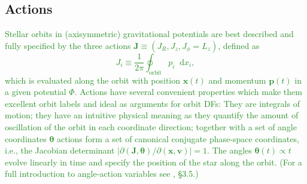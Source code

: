 \documentclass[iop,revtex4]{emulateapj}
\newcommand{\vect}[1]{\boldsymbol{#1}}
\newcommand*\diff{\mathop{}\!\mathrm{d}}
\newcommand{\NEW}[1]{\textcolor{ForestGreen}{#1}}
\newcommand{\OLD}[1]{}
\begin{document}

\subsection{Actions}  


\NEW{Stellar orbits in (axisymmetric) gravitational potentials are best described and fully specified by the three actions $\vect{J} \equiv (J_R, J_z, J_\phi=L_z)$, defined as
\begin{equation}
J_i \equiv \frac{1}{2\pi} \oint_\text{orbit} p_i \diff x_i, \label{eq:action_general}
\end{equation}
which is evaluated along the orbit with position $\vect{x}(t)$ and momentum $\vect{p}(t)$ in a given potential $\Phi$. Actions have several convenient properties which make them excellent orbit labels and ideal as arguments for orbit DFs: They are integrals of motion; they have an intuitive physical meaning as they quantify the amount of oscillation of the orbit in each coordinate direction; together with a set of angle coordinates $\vect{\theta}$ actions form a set of canonical conjugate phase-space coordinates, i.e., the Jacobian determinant $\left| \partial(\vect{J},\vect{\theta}) / \partial (\vect{x},\vect{v}) \right|=1$. The angles $\vect{\theta}(t)\propto t$ evolve linearly in time and specify the position of the star along the orbit.  (For a full introduction to angle-action variables see \citealt{2008gady.book.....B}, \S 3.5.)}

\OLD{Orbits in an axisymmetric gravitational potential $\Phi$ are best described and fully specified by the three actions $\vect{J} \equiv (J_R, J_z, J_\phi\equiv L_z)$ (Binney \& Tremaine 2008, \S 3.5).} 
\end{document}
